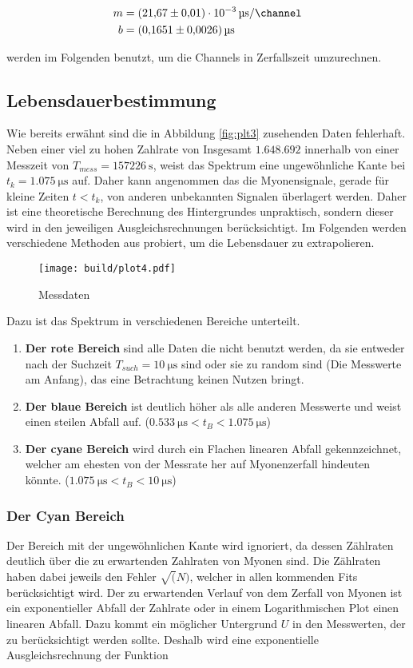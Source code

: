 \begin{align*}
	m&=\qty{21,67(0,01)e-3}{\us\per\channel}\\
	b&=\qty{0,1651(0,0026)}{\us}
\end{align*}

werden im Folgenden benutzt, um die Channels in Zerfallszeit umzurechnen. 

\subsection{Lebensdauerbestimmung}
Wie bereits erwähnt sind die in Abbildung \eqref{fig:plt3} zusehenden Daten fehlerhaft. 
Neben einer viel zu hohen Zahlrate von Insgesamt $1.648.692$ innerhalb von einer Messzeit von $T_{mess}=\qty{157226}{\s}$,
weist das Spektrum eine ungewöhnliche Kante bei $t_k=\qty{1.075}{\us}$ auf.
Daher kann angenommen das die Myonensignale, gerade für kleine Zeiten $t<t_k$, von anderen unbekannten Signalen überlagert werden. 
Daher ist eine theoretische Berechnung des Hintergrundes unpraktisch, sondern dieser wird in den jeweiligen Ausgleichsrechnungen berücksichtigt. 
Im Folgenden werden verschiedene Methoden aus probiert, um die Lebensdauer zu extrapolieren. 
 
\begin{figure}[H]
	\centering
	\texttt{[image: build/plot4.pdf]}
	\caption{Messdaten}\label{fig:plt4}
\end{figure}

Dazu ist das Spektrum in verschiedenen Bereiche unterteilt. 

\begin{enumerate}
	\item \textbf{Der rote Bereich} sind alle Daten die nicht benutzt werden, da sie entweder nach der Suchzeit $T_{such}=\qty{10}{\us}$ sind 
	oder sie zu random sind (Die Messwerte am Anfang), das eine Betrachtung keinen Nutzen bringt. 
	\item \textbf{Der blaue Bereich} ist deutlich höher als alle anderen Messwerte und weist einen steilen Abfall auf. ($\qty{0.533}{\us}<t_B<\qty{1.075}{\us}$)
	\item \textbf{Der cyane Bereich} wird durch ein Flachen linearen Abfall gekennzeichnet, 
	welcher am ehesten von der Messrate her auf Myonenzerfall hindeuten könnte. ($\qty{1.075}{\us}<t_B<\qty{10}{\us}$)
\end{enumerate}

\subsubsection{Der Cyan Bereich}
Der Bereich mit der ungewöhnlichen Kante wird ignoriert, da dessen Zählraten deutlich über die zu erwartenden Zahlraten von Myonen sind. 
Die Zählraten haben dabei jeweils den Fehler $\sqrt(N) $, welcher in allen kommenden Fits berücksichtigt wird. 
Der zu erwartenden Verlauf von dem Zerfall von Myonen ist ein exponentieller Abfall der Zahlrate oder in einem Logarithmischen Plot einen linearen Abfall. 
Dazu kommt ein möglicher Untergrund $U$ in den Messwerten, der zu berücksichtigt werden sollte. 
Deshalb wird eine exponentielle Ausgleichsrechnung der Funktion

